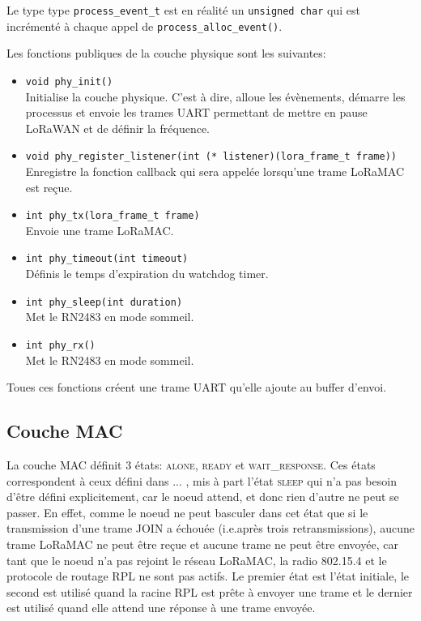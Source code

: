     Le type type \texttt{process\_event\_t} est en réalité un \texttt{unsigned char} qui est incrémenté à chaque appel de \texttt{process\_alloc\_event()}.

    Les fonctions publiques de la couche physique sont les suivantes:
    \begin{itemize}
        \item \texttt{void phy\_init()}\\
            Initialise la couche physique. C'est à dire, alloue les évènements, démarre les processus et envoie les trames UART permettant de mettre en pause LoRaWAN et de définir la fréquence.
        \item \texttt{void phy\_register\_listener(int (* listener)(lora\_frame\_t frame))}\\
            Enregistre la fonction callback qui sera appelée lorsqu'une trame LoRaMAC est reçue.
        \item \texttt{int phy\_tx(lora\_frame\_t frame)}\\
            Envoie une trame LoRaMAC.
        \item \texttt{int phy\_timeout(int timeout)}\\
            Définis le temps d'expiration du watchdog timer.
        \item \texttt{int phy\_sleep(int duration)}\\
            Met le RN2483 en mode sommeil.
        \item \texttt{int phy\_rx()}\\
            Met le RN2483 en mode sommeil.
    \end{itemize}

    Toues ces fonctions créent une trame UART qu'elle ajoute au buffer d'envoi.

\subsection*{Couche MAC}
    La couche MAC définit 3 états: \textsc{alone}, \textsc{ready} et \textsc{wait\_response}.
    Ces états correspondent à ceux défini dans ... , mis à part l'état \textsc{sleep} qui n'a pas 
    besoin d'être défini explicitement, car le noeud attend, et donc rien d'autre ne peut se 
    passer. En effet, comme le noeud ne peut basculer dans cet état que si le transmission d'une 
    trame JOIN a échouée (i.e.après trois retransmissions), aucune trame LoRaMAC ne peut être reçue 
    et aucune trame ne peut être envoyée, car tant que le noeud n'a pas rejoint le réseau LoRaMAC, 
    la radio 802.15.4 et le protocole de routage RPL ne sont pas actifs.
    Le premier état est l'état initiale, le second est utilisé quand la racine RPL est prête à 
    envoyer une trame et le dernier est utilisé quand elle attend une réponse à une trame envoyée.

